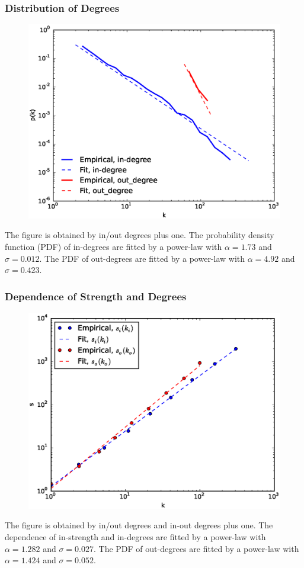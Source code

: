 \documentclass{beamer}
\begin{document}
\begin{frame}
\frametitle{Distribution of Degrees}
\begin{figure}
\includegraphics[width=0.65\linewidth]{degreepdf.eps}
\end{figure}
\small{The figure is obtained by in/out degrees plus one. The probability density function (PDF) of in-degrees are fitted by a power-law with $\alpha=1.73$ and $\sigma=0.012$. The PDF of out-degrees are fitted by a power-law with $\alpha=4.92$ and $\sigma=0.423$.}
\end{frame}

\begin{frame}
\frametitle{Dependence of Strength and Degrees}
\begin{figure}
\includegraphics[width=0.65\linewidth]{sd.eps}
\end{figure}
\small{The figure is obtained by in/out degrees and in-out degrees plus one. The dependence of in-strength and in-degrees are fitted by a power-law with $\alpha=1.282$ and $\sigma=0.027$. The PDF of out-degrees are fitted by a power-law with $\alpha=1.424$ and $\sigma=0.052$.}
\end{frame}
\end{document}
